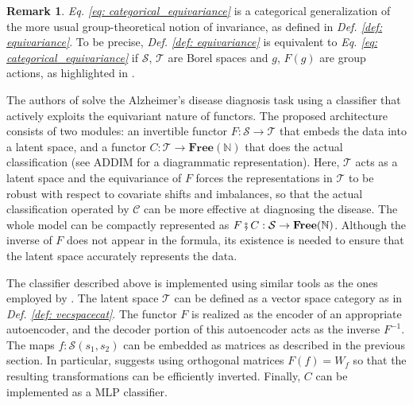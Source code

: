 \documentclass[11pt,a4paper,openright,twoside]{report}
\newcounter{mycounter}
\theoremstyle{plain}
\theoremstyle{definition}
\newtheorem{remark}[mycounter]{Remark}
\begin{document}
\begin{remark}
  \textit{Eq. \ref{eq: categorical_equivariance}} is a categorical generalization of the more usual group-theoretical notion of invariance, as defined in \textit{Def. \ref{def: equivariance}}. To be precise, \textit{Def. \ref{def: equivariance}} is equivalent to \textit{Eq. \ref{eq: categorical_equivariance}} if $\mathcal{S}$, $\mathcal{T}$ are Borel spaces and $g$, $F(g)$ are group actions, as highlighted in \cite{chytas2024poolingimagedatasetsmultiple}.
\end{remark}


The authors of \cite{chytas2024poolingimagedatasetsmultiple} solve the Alzheimer's disease diagnosis task using a classifier that actively exploits the equivariant nature of functors. The proposed architecture consists of two modules: an invertible functor $F: \mathcal{S} \to \mathcal{T}$ that embeds the data into a latent space, and a functor $C: \mathcal{T} \to \mathbf{Free}(\mathbb{N})$ that does the actual classification (see ADDIM for a diagrammatic representation). Here, $\mathcal{T}$ acts as a latent space and the equivariance of $F$ forces the representations in $\mathcal{T}$ to be robust with respect to covariate shifts and imbalances, so that the actual classification operated by $\mathcal{C}$ can be more effective at diagnosing the disease. The whole model can be compactly represented as $F \fatsemi C: \mathcal{S} \to \mathbf{Free}(\mathbb{N})$. Although the inverse of $F$ does not appear in the formula, its existence is needed to ensure that the latent space accurately represents the data.


The classifier described above is implemented using similar tools as the ones employed by \cite{sheshmani2021categorical}. The latent space $\mathcal{T}$ can be defined as a vector space category as in \textit{Def. \ref{def: vecspacecat}}. The functor $F$ is realized as the encoder of an appropriate autoencoder, and the decoder portion of this autoencoder acts as the inverse $F^{-1}$. The maps $f: \mathcal{S}(s_1,s_2)$ can be embedded as matrices as described in the previous section. In particular, \cite{chytas2024poolingimagedatasetsmultiple}  suggests using orthogonal matrices $F(f) = W_f$ so that the resulting transformations can be efficiently inverted.
Finally, $C$ can be implemented as a MLP classifier.
\end{document}
